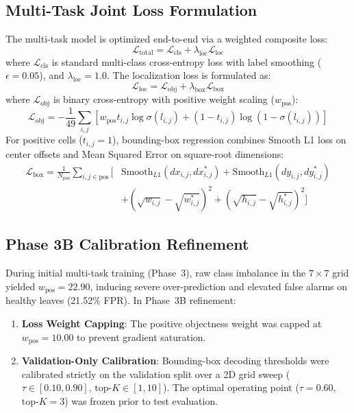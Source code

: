 \documentclass[conference]{IEEEtran}
\begin{document}
\subsection{Multi-Task Joint Loss Formulation}
The multi-task model is optimized end-to-end via a weighted composite loss:
\begin{equation}
\mathcal{L}_{\text{total}} = \mathcal{L}_{\text{cls}} + \lambda_{\text{loc}} \mathcal{L}_{\text{loc}}
\end{equation}
where $\mathcal{L}_{\text{cls}}$ is standard multi-class cross-entropy loss with label smoothing ($\epsilon = 0.05$), and $\lambda_{\text{loc}} = 1.0$. The localization loss is formulated as:
\begin{equation}
\mathcal{L}_{\text{loc}} = \mathcal{L}_{\text{obj}} + \lambda_{\text{box}} \mathcal{L}_{\text{box}}
\end{equation}
where $\mathcal{L}_{\text{obj}}$ is binary cross-entropy with positive weight scaling ($w_{\text{pos}}$):
\begin{equation}
\mathcal{L}_{\text{obj}} = -\frac{1}{49} \sum_{i,j} \left[ w_{\text{pos}} t_{i,j} \log \sigma(l_{i,j}) + (1 - t_{i,j}) \log (1 - \sigma(l_{i,j})) \right]
\end{equation}
For positive cells ($t_{i,j} = 1$), bounding-box regression combines Smooth L1 loss on center offsets and Mean Squared Error on square-root dimensions:
\begin{equation}
\begin{split}
\mathcal{L}_{\text{box}} = \frac{1}{N_{\text{pos}}} \sum_{i,j \in \text{pos}} \Big[ & \text{Smooth}_{L1}(dx_{i,j}, dx^*_{i,j}) + \text{Smooth}_{L1}(dy_{i,j}, dy^*_{i,j}) \\
& + (\sqrt{w_{i,j}} - \sqrt{w^*_{i,j}})^2 + (\sqrt{h_{i,j}} - \sqrt{h^*_{i,j}})^2 \Big]
\end{split}
\end{equation}

\subsection{Phase 3B Calibration Refinement}
During initial multi-task training (Phase~3), raw class imbalance in the $7\times 7$ grid yielded $w_{\text{pos}} = 22.90$, inducing severe over-prediction and elevated false alarms on healthy leaves (21.52\% FPR). In Phase~3B refinement:
\begin{enumerate}
    \item \textbf{Loss Weight Capping}: The positive objectness weight was capped at $w_{\text{pos}} = 10.00$ to prevent gradient saturation.
    \item \textbf{Validation-Only Calibration}: Bounding-box decoding thresholds were calibrated strictly on the validation split over a 2D grid sweep ($\tau \in [0.10, 0.90]$, $\text{top-}K \in [1, 10]$). The optimal operating point ($\tau = 0.60$, $\text{top-}K = 3$) was frozen prior to test evaluation.
\end{enumerate}
\end{document}
